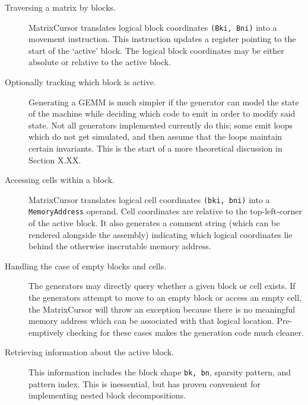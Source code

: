     \begin{description}

    \item[Traversing a matrix by blocks.] MatrixCursor translates logical block coordinates \texttt{(Bki, Bni)} into a movement instruction. This instruction updates a register pointing to the start of the `active' block. The logical block coordinates may be either absolute or relative to the active block.

    \item[Optionally tracking which block is active.] Generating a GEMM is much simpler if the generator can model the state of the machine while deciding which code to emit in order to modify said state. Not all generators implemented currently do this; some emit loops which do not get simulated, and then assume that the loops maintain certain invariants. This is the start of a more theoretical discussion in Section X.XX. 

    \item[Accessing cells within a block.] MatrixCursor translates logical cell coordinates \texttt{(bki, bni)} into a \texttt{MemoryAddress} operand. Cell coordinates are relative to the top-left-corner of the active block. It also generates a comment string (which can be rendered alongside the assembly) indicating which logical coordinates lie behind the otherwise inscrutable memory address.

    \item[Handling the case of empty blocks and cells.] The generators may directly query whether a given block or cell exists. If the generators attempt to move to an empty block or access an empty cell, the MatrixCursor will throw an exception because there is no meaningful memory address which can be associated with that logical location. Pre-emptively checking for these cases makes the generation code much cleaner.

    \item[Retrieving information about the active block.] This information includes the block shape \texttt{bk, bn}, sparsity pattern, and pattern index. This is inessential, but has proven convenient for implementing nested block decompositions.

    \end{description}

